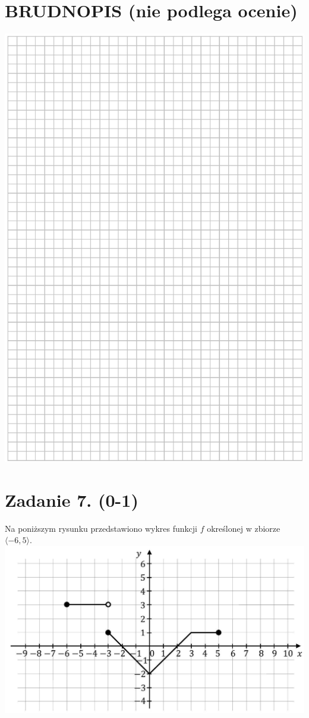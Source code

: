 \documentclass[10pt]{article}
\begin{document}
\section*{BRUDNOPIS (nie podlega ocenie)}
\begin{center}
\includegraphics[max width=\textwidth]{2024_11_21_46d945490f1b2eff1c8eg-03}
\end{center}

\section*{Zadanie 7. (0-1)}
Na poniższym rysunku przedstawiono wykres funkcji \(f\) określonej w zbiorze \(\langle-6,5\rangle\).\\
\includegraphics[max width=\textwidth, center]{2024_11_21_46d945490f1b2eff1c8eg-04(1)}
\end{document}
